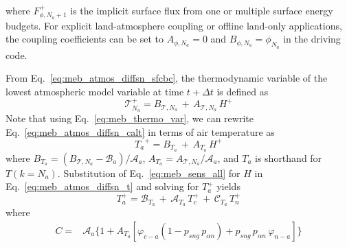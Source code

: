 {%
%
where $F_{\phi,{N_a}+1}^+$ is the implicit surface flux from one or
multiple surface energy budgets.
%
%
For explicit land-atmosphere coupling or offline land-only
applications, the coupling coefficients can be set to
$A_{\phi,{N_a}}=0$ and $B_{\phi,{N_a}}={\phi_{N_a}}$ in the driving
code.



From Eq.~\ref{eq:meb_atmos_diffsn_sfcbc}, the thermodynamic variable of the lowest
atmospheric model variable at time $t+\Delta t$ is
defined as
%
\begin{equation}
\label{eq:meb_atmos_diffsn_calt}
{\mathcal{T}}_{N_a}^+ = B_{{\mathcal{T}},N_a} \,+\, A_{{\mathcal{T}},N_a}\,H^+
\end{equation}
%
Note that using Eq.~\ref{eq:meb_thermo_var}, we can rewrite Eq.~\ref{eq:meb_atmos_diffsn_calt}
in terms of air temperature as
%
\begin{equation}
\label{eq:meb_atmos_diffsn_t}
{T_a}^+ = B_{T_a} \,+\, A_{T_a}\,H^+
\end{equation}
%
where $B_{T_a}=\left(B_{{\mathcal{T}},N_a}-{\mathcal B}_a\right)/{\mathcal A}_a$, 
$A_{T_a}=A_{{\mathcal{T}},N_a}/{\mathcal A}_a$, 
and $T_a$ is shorthand for $T(k=N_a)$.
Substitution of Eq.~\ref{eq:meb_sens_all} for $H$ in Eq.~\ref{eq:meb_atmos_diffsn_t}
and solving for $T_a^+$ yields
%
\begin{equation}
  \label{eq:meb_heat_atmos_n}
T_{a}^+ = {\mathscr B}_{T_a} \,+\, {\mathscr A}_{T_a} \, T_c^+ \,+\,
{\mathscr C}_{T_a} \, T_n^+ 
%
\end{equation}
%
where
%
\begin{subequations}\label{eq:meb_atmos_coupl_coefs_s}
\begin{align}
\label{eq:meb_atmos_coupl_coefs_s_cc}
C =& {\mathcal A}_{a}\Big\lbrace 1+ A_{T_a} \left[\varphi_{c-a}
\left(1-p_{sng}\,p_{\alpha n} \right)
+ p_{sng}\,p_{\alpha n}\,\varphi_{n-a}\right] \Big\rbrace

\end{align}
\end{subequations}}

